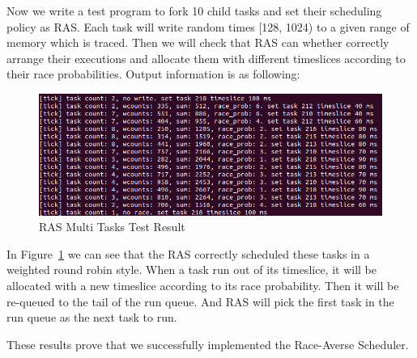 Now we write a test program to fork 10 child tasks and set their scheduling policy as RAS. Each task will write random times [128, 1024) to a given range of memory which is traced. Then we will check that RAS can whether correctly arrange their executions and allocate them with different timeslices according to their race probabilities. Output information is as following:

\begin{figure}[!htp]
  \centering
  \includegraphics[width=13cm]{figures/multasktest1.png}
  \caption{RAS Multi Tasks Test Result}
  \label{fig:multitasktest}
\end{figure}

In Figure~\ref{fig:multitasktest} we can see that the RAS correctly scheduled these tasks in a weighted round robin style. When a task run out of its timeslice, it will be allocated with a new timeslice according to its race probability. Then it will be re-queued to the tail of the run queue. And RAS will pick the first task in the run queue as the next task to run.

These results prove that we successfully implemented the Race-Averse Scheduler.